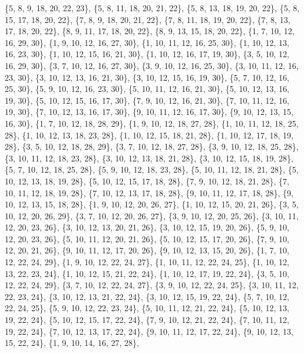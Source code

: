 \documentclass[11pt,a4paper]{article}
\begin{document}
{\{5, 8, 9, 18, 20, 22, 23\}, \{5, 8, 11, 18, 20, 21, 22\}, \{5, 8, 13, 18, 19, 20, 22\}, \{5, 8, 15, 17, 18, 20, 22\}, \{7, 8, 9, 18, 20, 21, 22\},
\{7, 8, 11, 18, 19, 20, 22\}, \{7, 8, 13, 17, 18, 20, 22\}, \{8, 9, 11, 17, 18, 20, 22\}, \{8, 9, 13, 15, 18, 20, 22\}, \{1, 7, 10, 12, 16, 29, 30\},
\{1, 9, 10, 12, 16, 27, 30\}, \{1, 10, 11, 12, 16, 25, 30\}, \{1, 10, 12, 13, 16, 23, 30\}, \{1, 10, 12, 15, 16, 21, 30\}, \{1, 10, 12, 16, 17, 19, 30\},
\{3, 5, 10, 12, 16, 29, 30\}, \{3, 7, 10, 12, 16, 27, 30\}, \{3, 9, 10, 12, 16, 25, 30\}, \{3, 10, 11, 12, 16, 23, 30\}, \{3, 10, 12, 13, 16, 21, 30\},
\{3, 10, 12, 15, 16, 19, 30\}, \{5, 7, 10, 12, 16, 25, 30\}, \{5, 9, 10, 12, 16, 23, 30\}, \{5, 10, 11, 12, 16, 21, 30\}, \{5, 10, 12, 13, 16, 19, 30\},
\{5, 10, 12, 15, 16, 17, 30\}, \{7, 9, 10, 12, 16, 21, 30\}, \{7, 10, 11, 12, 16, 19, 30\}, \{7, 10, 12, 13, 16, 17, 30\}, \{9, 10, 11, 12, 16, 17, 30\},
\{9, 10, 12, 13, 15, 16, 30\}, \{1, 7, 10, 12, 18, 28, 29\}, \{1, 9, 10, 12, 18, 27, 28\}, \{1, 10, 11, 12, 18, 25, 28\}, \{1, 10, 12, 13, 18, 23, 28\},
\{1, 10, 12, 15, 18, 21, 28\}, \{1, 10, 12, 17, 18, 19, 28\}, \{3, 5, 10, 12, 18, 28, 29\}, \{3, 7, 10, 12, 18, 27, 28\}, \{3, 9, 10, 12, 18, 25, 28\},
\{3, 10, 11, 12, 18, 23, 28\}, \{3, 10, 12, 13, 18, 21, 28\}, \{3, 10, 12, 15, 18, 19, 28\}, \{5, 7, 10, 12, 18, 25, 28\}, \{5, 9, 10, 12, 18, 23, 28\},
\{5, 10, 11, 12, 18, 21, 28\}, \{5, 10, 12, 13, 18, 19, 28\}, \{5, 10, 12, 15, 17, 18, 28\}, \{7, 9, 10, 12, 18, 21, 28\}, \{7, 10, 11, 12, 18, 19, 28\},
\{7, 10, 12, 13, 17, 18, 28\}, \{9, 10, 11, 12, 17, 18, 28\}, \{9, 10, 12, 13, 15, 18, 28\}, \{1, 9, 10, 12, 20, 26, 27\}, \{1, 10, 12, 15, 20, 21, 26\},
\{3, 5, 10, 12, 20, 26, 29\}, \{3, 7, 10, 12, 20, 26, 27\}, \{3, 9, 10, 12, 20, 25, 26\}, \{3, 10, 11, 12, 20, 23, 26\}, \{3, 10, 12, 13, 20, 21, 26\},
\{3, 10, 12, 15, 19, 20, 26\}, \{5, 9, 10, 12, 20, 23, 26\}, \{5, 10, 11, 12, 20, 21, 26\}, \{5, 10, 12, 15, 17, 20, 26\}, \{7, 9, 10, 12, 20, 21, 26\},
\{9, 10, 11, 12, 17, 20, 26\}, \{9, 10, 12, 13, 15, 20, 26\}, \{1, 7, 10, 12, 22, 24, 29\}, \{1, 9, 10, 12, 22, 24, 27\}, \{1, 10, 11, 12, 22, 24, 25\},
\{1, 10, 12, 13, 22, 23, 24\}, \{1, 10, 12, 15, 21, 22, 24\}, \{1, 10, 12, 17, 19, 22, 24\}, \{3, 5, 10, 12, 22, 24, 29\}, \{3, 7, 10, 12, 22, 24, 27\},
\{3, 9, 10, 12, 22, 24, 25\}, \{3, 10, 11, 12, 22, 23, 24\}, \{3, 10, 12, 13, 21, 22, 24\}, \{3, 10, 12, 15, 19, 22, 24\}, \{5, 7, 10, 12, 22, 24, 25\},
\{5, 9, 10, 12, 22, 23, 24\}, \{5, 10, 11, 12, 21, 22, 24\}, \{5, 10, 12, 13, 19, 22, 24\}, \{5, 10, 12, 15, 17, 22, 24\}, \{7, 9, 10, 12, 21, 22, 24\},
\{7, 10, 11, 12, 19, 22, 24\}, \{7, 10, 12, 13, 17, 22, 24\}, \{9, 10, 11, 12, 17, 22, 24\}, \{9, 10, 12, 13, 15, 22, 24\}, \{1, 9, 10, 14, 16, 27, 28\},
}
\end{document}
